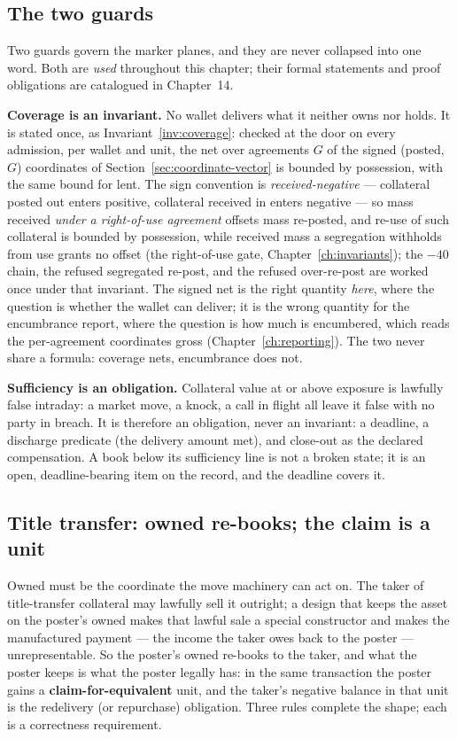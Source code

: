 \documentclass[11pt,a4paper]{article}
\begin{document}
\subsection{The two guards}

Two guards govern the marker planes, and they are never collapsed into one
word. Both are \emph{used} throughout this chapter; their formal statements and
proof obligations are catalogued in Chapter~14.

\textbf{Coverage is an invariant.} No wallet delivers what it neither owns nor
holds. It is stated once, as Invariant~\ref{inv:coverage}: checked at the door on
every admission, per wallet and unit, the net over agreements $G$ of the signed
(posted, $G$) coordinates of Section~\ref{sec:coordinate-vector} is bounded by
possession, with the same bound for lent. The sign convention is
\emph{received-negative} --- collateral posted out enters positive, collateral
received in enters negative --- so mass received \emph{under a right-of-use agreement}
offsets mass re-posted, and re-use of such collateral is bounded by possession, while
received mass a segregation withholds from use grants no offset (the right-of-use gate,
Chapter~\ref{ch:invariants}); the $-40$ chain, the refused segregated re-post, and the
refused over-re-post are worked once under that invariant. The signed net is the right
quantity \emph{here}, where the question is whether the wallet can deliver; it is
the wrong quantity for the encumbrance report, where the question is how much is
encumbered, which reads the per-agreement coordinates gross
(Chapter~\ref{ch:reporting}). The two never share a formula: coverage nets,
encumbrance does not.

\textbf{Sufficiency is an obligation.} Collateral value at or above exposure
is lawfully false intraday: a market move, a knock, a call in flight all leave
it false with no party in breach. It is therefore an obligation, never an
invariant: a deadline, a discharge predicate (the delivery amount met), and
close-out as the declared compensation. A book below its sufficiency line is
not a broken state; it is an open, deadline-bearing item on the record, and
the deadline covers it.

\subsection{Title transfer: owned re-books; the claim is a unit}

Owned must be the coordinate the move machinery can act on. The taker of
title-transfer collateral may lawfully sell it outright; a design that keeps
the asset on the poster's owned makes that lawful sale a special constructor
and makes the manufactured payment --- the income the taker owes back to the
poster --- unrepresentable. So the poster's owned re-books to the taker, and
what the poster keeps is what the poster legally has: in the same transaction
the poster gains a \textbf{claim-for-equivalent} unit, and the taker's
negative balance in that unit is the redelivery (or repurchase) obligation.
Three rules complete the shape; each is a correctness requirement.
\end{document}
